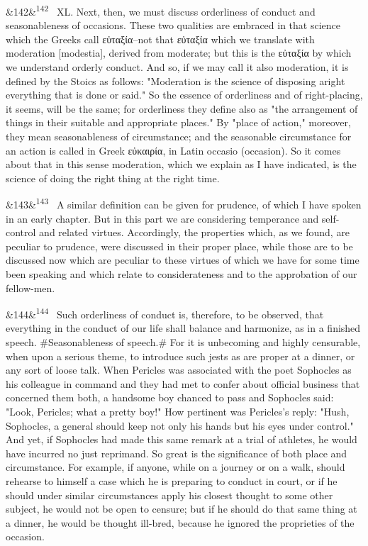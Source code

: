 \documentclass[12pt]{article}
\newcommand{\para}[1][]{\par\noindent\ifx&#1&\else\textsuperscript{\footnotesize #1}~\fi}
\begin{document}
\para[142] XL. Next, then, we must discuss orderliness of conduct and seasonableness of occasions. These two qualities are embraced in that science which the Greeks call εὐταξία--not that εὐταξία which we translate with moderation [modestia], derived from moderate; but this is the εὐταξία by which we understand orderly conduct. And so, if we may call it also moderation, it is defined by the Stoics as follows: "Moderation is the science of disposing aright everything that is done or said." So the essence of orderliness and of right-placing, it seems, will be the same; for orderliness they define also as "the arrangement of things in their suitable and appropriate places." By "place of action," moreover, they mean seasonableness of circumstance; and the seasonable circumstance for an action is called in Greek εὐκαιρία, in Latin occasio (occasion). So it comes about that in this sense moderation, which we explain as I have indicated, is the science of doing the right thing at the right time.

\para[143] A similar definition can be given for prudence, of which I have spoken in an early chapter. But in this part we are considering temperance and self-control and related virtues. Accordingly, the properties which, as we found, are peculiar to prudence, were discussed in their proper place, while those are to be discussed now which are peculiar to these virtues of which we have for some time been speaking and which relate to considerateness and to the approbation of our fellow-men.

\para[144] Such orderliness of conduct is, therefore, to be observed, that everything in the conduct of our life shall balance and harmonize, as in a finished speech. \#Seasonableness of speech.\# For it is unbecoming and highly censurable, when upon a serious theme, to introduce such jests as are proper at a dinner, or any sort of loose talk. When Pericles was associated with the poet Sophocles as his colleague in command and they had met to confer about official business that concerned them both, a handsome boy chanced to pass and Sophocles said: "Look, Pericles; what a pretty boy!" How pertinent was Pericles's reply: "Hush, Sophocles, a general should keep not only his hands but his eyes under control." And yet, if Sophocles had made this same remark at a trial of athletes, he would have incurred no just reprimand. So great is the significance of both place and circumstance. For example, if anyone, while on a journey or on a walk, should rehearse to himself a case which he is preparing to conduct in court, or if he should under similar circumstances apply his closest thought to some other subject, he would not be open to censure; but if he should do that same thing at a dinner, he would be thought ill-bred, because he ignored the proprieties of the occasion.
\end{document}
